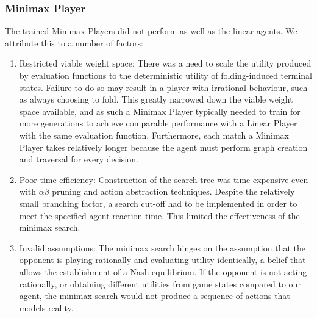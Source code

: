 \documentclass{article}
\begin{document}
\subsubsection{Minimax Player}
The trained Minimax Players did not perform as well as the linear agents. We attribute this to a number of factors:
\begin{enumerate}
   \item Restricted viable weight space: There was a need to scale the utility produced by evaluation functions to the deterministic utility of folding-induced terminal states. Failure to do so may result in a player with irrational behaviour, such as always choosing to fold. This greatly narrowed down the viable weight space available, and as such a Minimax Player typically needed to train for more generations to achieve comparable performance with a Linear Player with the same evaluation function. Furthermore, each match a Minimax Player takes relatively longer because the agent must perform graph creation and traversal for every decision.
   \item Poor time efficiency: Construction of the search tree was time-expensive even with $\alpha\beta$ pruning and action abstraction techniques. Despite the relatively small branching factor, a search cut-off had to be implemented in order to meet the specified agent reaction time. This limited the effectiveness of the minimax search.
   \item Invalid assumptions: The minimax search hinges on the assumption that the opponent is playing rationally and evaluating utility identically, a belief that allows the establishment of a Nash equilibrium. If the opponent is not acting rationally, or obtaining different utilities from game states compared to our agent, the minimax search would not produce a sequence of actions that models reality.
\end{enumerate}

\end{document}
